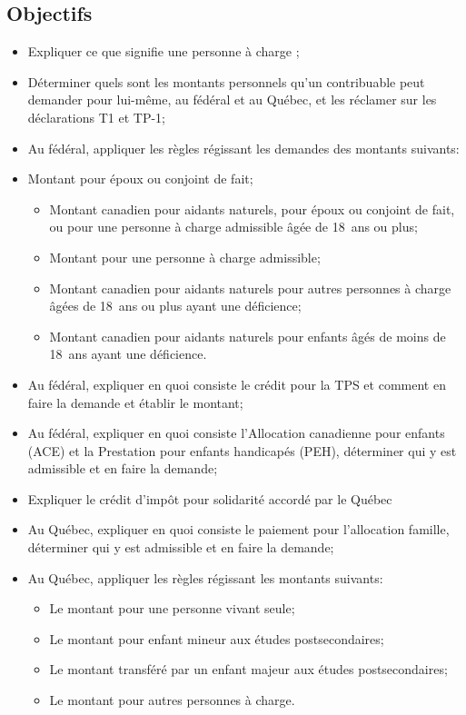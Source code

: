 \subsection{Objectifs}
\begin{itemize}
	\item Expliquer ce que signifie une \og personne à charge \fg{};
	\item Déterminer quels sont les montants personnels qu'un contribuable peut demander pour lui-même, au fédéral et au Québec, et les réclamer sur les déclarations T1 et TP-1;
	\item Au fédéral, appliquer les règles régissant les demandes des montants suivants:
	\item Montant pour époux ou conjoint de fait;
	\begin{itemize}
		\item Montant canadien pour aidants naturels, pour époux ou conjoint de fait, ou pour une personne à charge admissible âgée de 18~ans ou plus;
		\item Montant pour une personne à charge admissible;
		\item Montant canadien pour aidants naturels pour autres personnes à charge âgées de 18~ans ou plus ayant une déficience;
		\item Montant canadien pour aidants naturels pour enfants âgés de moins de 18~ans ayant une déficience.
	\end{itemize}
	\item Au fédéral, expliquer en quoi consiste le crédit pour la TPS et comment en faire la demande et établir le montant;
	\item Au fédéral, expliquer en quoi consiste l'Allocation canadienne pour enfants (ACE) et la Prestation pour enfants handicapés (PEH), déterminer qui y est admissible et en faire la demande;
	\item Expliquer le crédit d'impôt pour solidarité accordé par le Québec
	\item Au Québec, expliquer en quoi consiste le paiement pour l'allocation famille, déterminer qui y est admissible et en faire la demande;
	\item Au Québec, appliquer les règles régissant les montants suivants:
	\begin{itemize}
		\item Le montant pour une personne vivant seule;
		\item Le montant pour enfant mineur aux études postsecondaires;
		\item Le montant transféré par un enfant majeur aux études postsecondaires;
		\item Le montant pour autres personnes à charge.
	\end{itemize}
\end{itemize}


